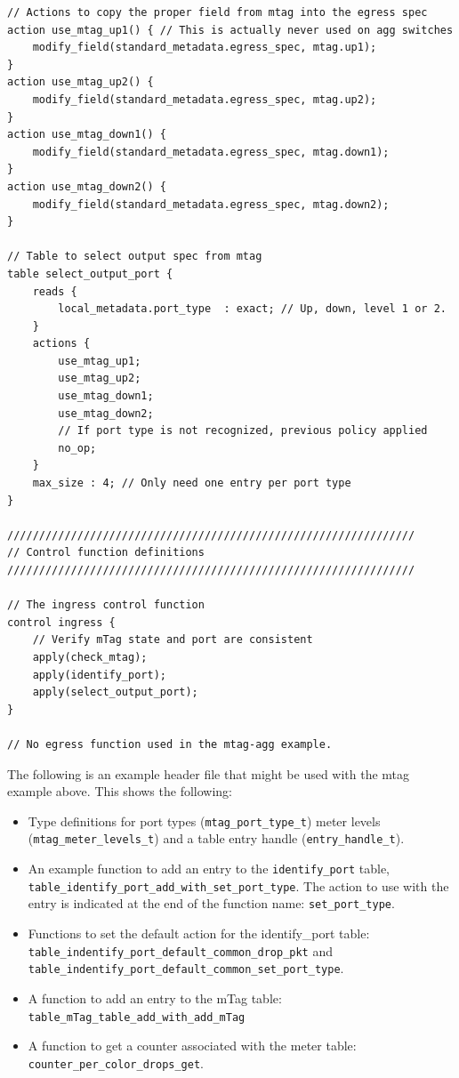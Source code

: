 \documentclass[12pt]{article}
\begin{document}
\begin{itemize}
\begin{lstlisting}[keywords={},frame=single,escapechar=\@]
// Actions to copy the proper field from mtag into the egress spec
action use_mtag_up1() { // This is actually never used on agg switches
    modify_field(standard_metadata.egress_spec, mtag.up1);
}
action use_mtag_up2() {
    modify_field(standard_metadata.egress_spec, mtag.up2);
}
action use_mtag_down1() {
    modify_field(standard_metadata.egress_spec, mtag.down1);
}
action use_mtag_down2() {
    modify_field(standard_metadata.egress_spec, mtag.down2);
}

// Table to select output spec from mtag
table select_output_port {
    reads {
        local_metadata.port_type  : exact; // Up, down, level 1 or 2.
    }
    actions {
        use_mtag_up1;
        use_mtag_up2;
        use_mtag_down1;
        use_mtag_down2;
        // If port type is not recognized, previous policy applied
        no_op; 
    }
    max_size : 4; // Only need one entry per port type
}

////////////////////////////////////////////////////////////////
// Control function definitions
////////////////////////////////////////////////////////////////

// The ingress control function
control ingress {
    // Verify mTag state and port are consistent
    apply(check_mtag);
    apply(identify_port);
    apply(select_output_port);
}

// No egress function used in the mtag-agg example.
\end{lstlisting}

The following is an example header file that might be used with the mtag example 
above. This shows the following:

\begin{itemize}
\item
Type definitions for port types (\texttt{mtag_port_type_t}) meter levels \\
(\texttt{mtag_meter_levels_t}) 
and a table entry handle (\texttt{entry_handle_t}).  
\item
An example function to add an entry to the \texttt{identify_port} table, \\
\texttt{table_identify_port_add_with_set_port_type}. 
The action to use with the entry is indicated at the end of the function name: 
\texttt{set_port_type}.
\item
Functions to set the default action for the identify_port table: \\
\texttt{table_indentify_port_default_common_drop_pkt} and \\
\texttt{table_indentify_port_default_common_set_port_type}.
\item
A function to add an entry to the mTag table: \\
\texttt{table_mTag_table_add_with_add_mTag}
\item
A function to get a counter associated with the meter table: \\
\texttt{counter_per_color_drops_get}.
\end{itemize}


\end{itemize}
\end{document}

